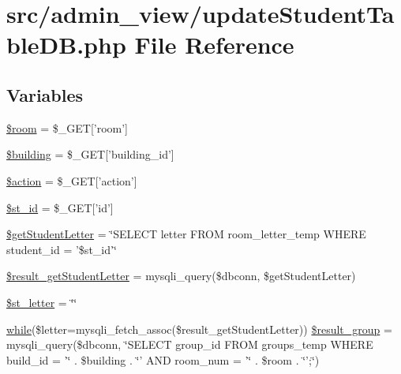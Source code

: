 \hypertarget{updateStudentTableDB_8php}{\section{src/admin\-\_\-view/update\-Student\-Table\-D\-B.php \-File \-Reference}
\label{updateStudentTableDB_8php}
}
\subsection*{\-Variables}
\begin{DoxyCompactItemize}
\item 
\hyperlink{updateStudentTableDB_8php_ab285a2e759ea45a70f8ff40a63d2fe89}{\$room} = \$\-\_\-\-G\-E\-T\mbox{[}'room'\mbox{]}
\item 
\hyperlink{updateStudentTableDB_8php_a903ab1c50249715a442ce81e6d5ba775}{\$building} = \$\-\_\-\-G\-E\-T\mbox{[}'building\-\_\-id'\mbox{]}
\item 
\hyperlink{updateStudentTableDB_8php_aa698a3e72116e8e778be0e95d908ee30}{\$action} = \$\-\_\-\-G\-E\-T\mbox{[}'action'\mbox{]}
\item 
\hyperlink{updateStudentTableDB_8php_ab68b86e23fd74e101c03130a49b24f66}{\$st\-\_\-id} = \$\-\_\-\-G\-E\-T\mbox{[}'id'\mbox{]}
\item 
\hyperlink{updateStudentTableDB_8php_af06279fba2b6159d32d26bae1bd62aee}{\$get\-Student\-Letter} = \char`\"{}\-S\-E\-L\-E\-C\-T letter \-F\-R\-O\-M room\-\_\-letter\-\_\-temp \-W\-H\-E\-R\-E student\-\_\-id = '\$st\-\_\-id'\char`\"{}
\item 
\hyperlink{updateStudentTableDB_8php_a570754c64bbdb4096bb2ee09f899cfb8}{\$result\-\_\-get\-Student\-Letter} = mysqli\-\_\-query(\$dbconn, \$get\-Student\-Letter)
\item 
\hyperlink{updateStudentTableDB_8php_aae4bfbe92cd3c7c9837886688f7440f5}{\$st\-\_\-letter} = \char`\"{}\char`\"{}
\item 
\hyperlink{studentForm_8php_abeb5d2366a9870820ffb1e260d040d8d}{while}(\$letter=mysqli\-\_\-fetch\-\_\-assoc(\$result\-\_\-get\-Student\-Letter)) \hyperlink{updateStudentTableDB_8php_a7ac58462dd2e6879a3f08e42f20adc8a}{\$result\-\_\-group} = mysqli\-\_\-query(\$dbconn, \char`\"{}\-S\-E\-L\-E\-C\-T group\-\_\-id \-F\-R\-O\-M groups\-\_\-temp \-W\-H\-E\-R\-E build\-\_\-id = '\char`\"{} . \$building . \char`\"{}' \-A\-N\-D room\-\_\-num = '\char`\"{} . \$room . \char`\"{}';\char`\"{})
\item 

\end{DoxyCompactItemize}
